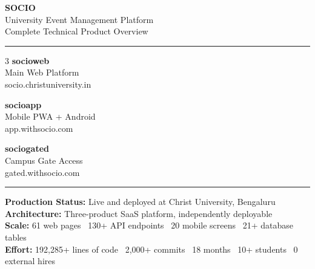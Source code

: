 \documentclass[12pt,a4paper]{article}
\begin{document}
\begin{titlepage}
    \centering
    \vspace*{2cm}

    {\fontsize{36}{44}\selectfont\bfseries\color{primary} SOCIO}\\[0.4cm]
    {\Large\color{accent} University Event Management Platform}\\[0.2cm]
    {\normalsize\color{darkgray} Complete Technical Product Overview}

    \vspace{1.5cm}
    \noindent\rule{\textwidth}{1.5pt}
    \vspace{0.4cm}

    \begin{multicols}{3}
        \centering
        {\large\bfseries socioweb}\\
        {\small Main Web Platform}\\[0.2cm]
        {\footnotesize\color{darkgray} socio.christuniversity.in}

        \columnbreak
        \centering
        {\large\bfseries socioapp}\\
        {\small Mobile PWA + Android}\\[0.2cm]
        {\footnotesize\color{darkgray} app.withsocio.com}

        \columnbreak
        \centering
        {\large\bfseries sociogated}\\
        {\small Campus Gate Access}\\[0.2cm]
        {\footnotesize\color{darkgray} gated.withsocio.com}
    \end{multicols}

    \vspace{0.4cm}
    \noindent\rule{\textwidth}{1.5pt}

    \vspace{2cm}

    \begin{highlightbox}
        \centering
        \textbf{Production Status:} Live and deployed at Christ University, Bengaluru\\
        \textbf{Architecture:} Three-product SaaS platform, independently deployable\\
        \textbf{Scale:} 61 web pages \textbullet\ 130+ API endpoints \textbullet\ 20 mobile screens \textbullet\ 21+ database tables\\
        \textbf{Effort:} 192,285+ lines of code \textbullet\ 2,000+ commits \textbullet\ 18 months \textbullet\ 10+ students \textbullet\ 0 external hires
    \end{highlightbox}


\end{titlepage}
\end{document}
